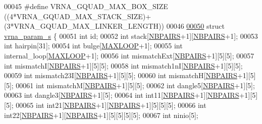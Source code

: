 \begin{DoxyCode}
00045 \textcolor{preprocessor}{#define   VRNA\_GQUAD\_MAX\_BOX\_SIZE       ((4*VRNA\_GQUAD\_MAX\_STACK\_SIZE)+(3*VRNA\_GQUAD\_MAX\_LINKER\_LENGTH))}
00046 
\hypertarget{params_8h_source_l00050}{}\hyperlink{group__energy__parameters}{00050} \textcolor{keyword}{struct }\hyperlink{group__energy__parameters_structvrna__param__s}{vrna\_param\_s} \{
00051   \textcolor{keywordtype}{int}     id;
00052   \textcolor{keywordtype}{int}     stack[\hyperlink{energy__const_8h_a5e75221c779d618eab81e096f37e32ce}{NBPAIRS}+1][\hyperlink{energy__const_8h_a5e75221c779d618eab81e096f37e32ce}{NBPAIRS}+1];
00053   \textcolor{keywordtype}{int}     hairpin[31];
00054   \textcolor{keywordtype}{int}     bulge[\hyperlink{energy__const_8h_ad1bd6eabac419670ddd3c9ed82145988}{MAXLOOP}+1];
00055   \textcolor{keywordtype}{int}     internal\_loop[\hyperlink{energy__const_8h_ad1bd6eabac419670ddd3c9ed82145988}{MAXLOOP}+1];
00056   \textcolor{keywordtype}{int}     mismatchExt[\hyperlink{energy__const_8h_a5e75221c779d618eab81e096f37e32ce}{NBPAIRS}+1][5][5];
00057   \textcolor{keywordtype}{int}     mismatchI[\hyperlink{energy__const_8h_a5e75221c779d618eab81e096f37e32ce}{NBPAIRS}+1][5][5];
00058   \textcolor{keywordtype}{int}     mismatch1nI[\hyperlink{energy__const_8h_a5e75221c779d618eab81e096f37e32ce}{NBPAIRS}+1][5][5];
00059   \textcolor{keywordtype}{int}     mismatch23I[\hyperlink{energy__const_8h_a5e75221c779d618eab81e096f37e32ce}{NBPAIRS}+1][5][5];
00060   \textcolor{keywordtype}{int}     mismatchH[\hyperlink{energy__const_8h_a5e75221c779d618eab81e096f37e32ce}{NBPAIRS}+1][5][5];
00061   \textcolor{keywordtype}{int}     mismatchM[\hyperlink{energy__const_8h_a5e75221c779d618eab81e096f37e32ce}{NBPAIRS}+1][5][5];
00062   \textcolor{keywordtype}{int}     dangle5[\hyperlink{energy__const_8h_a5e75221c779d618eab81e096f37e32ce}{NBPAIRS}+1][5];
00063   \textcolor{keywordtype}{int}     dangle3[\hyperlink{energy__const_8h_a5e75221c779d618eab81e096f37e32ce}{NBPAIRS}+1][5];
00064   \textcolor{keywordtype}{int}     int11[\hyperlink{energy__const_8h_a5e75221c779d618eab81e096f37e32ce}{NBPAIRS}+1][\hyperlink{energy__const_8h_a5e75221c779d618eab81e096f37e32ce}{NBPAIRS}+1][5][5];
00065   \textcolor{keywordtype}{int}     int21[\hyperlink{energy__const_8h_a5e75221c779d618eab81e096f37e32ce}{NBPAIRS}+1][\hyperlink{energy__const_8h_a5e75221c779d618eab81e096f37e32ce}{NBPAIRS}+1][5][5][5];
00066   \textcolor{keywordtype}{int}     int22[\hyperlink{energy__const_8h_a5e75221c779d618eab81e096f37e32ce}{NBPAIRS}+1][\hyperlink{energy__const_8h_a5e75221c779d618eab81e096f37e32ce}{NBPAIRS}+1][5][5][5][5];
00067   \textcolor{keywordtype}{int}     ninio[5];

\end{DoxyCode}
